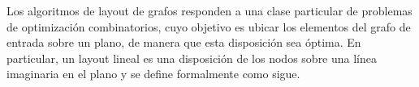 



Los algoritmos de layout de grafos responden a una clase particular de problemas de optimización combinatorios, cuyo objetivo es ubicar los elementos del  grafo de entrada sobre un plano,  de manera que esta disposición sea óptima. En  particular, un layout lineal es una disposición de los nodos sobre una línea imaginaria en el plano y se define formalmente como sigue.


